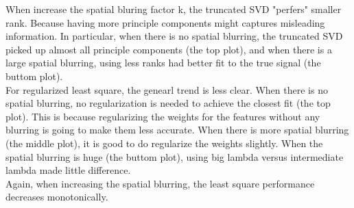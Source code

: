 \documentclass[paper=a4, fontsize=11pt]{scrartcl} %
\numberwithin{equation}{section} %
\numberwithin{figure}{section} %
\numberwithin{table}{section} %
\begin{document}
When increase the spatial bluring factor k, the truncated SVD "perfers" smaller rank. Because having more principle components might captures misleading information. In particular, when there is no spatial blurring, the truncated SVD picked up almost all principle components (the top plot), and when there is a large spatial blurring, using less ranks had better fit to the true signal (the buttom plot). \\

For regularized least square, the genearl trend is less clear. When there is no spatial blurring, no regularization is needed to achieve the closest fit (the top plot). This is because regularizing the weights for the features without any blurring is going to make them less accurate. When there is more spatial blurring (the middle plot), it is good to do regularize the weights slightly. When the spatial blurring is huge (the buttom plot), using big lambda versus intermediate lambda made little difference.\\

Again, when increasing the spatial blurring, the least square performance decreases monotonically. 
\end{document}
